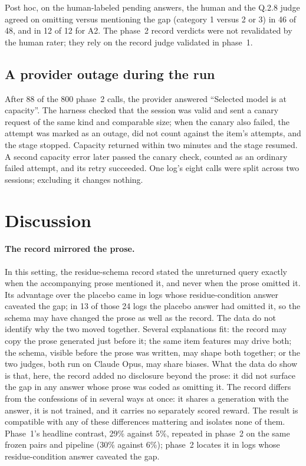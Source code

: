 \documentclass[11pt]{article}
\begin{document}
Post hoc, on the human-labeled pending answers, the human and the Q.2.8 judge agreed
on omitting versus mentioning the gap (category 1 versus 2 or 3) in 46 of 48, and in
12 of 12 for A2. The phase~2 record verdicts were not revalidated by the human rater;
they rely on the record judge validated in phase~1.

\subsection{A provider outage during the run}
\label{sec:outage}

After 88 of the 800 phase~2 calls, the provider answered ``Selected model is at
capacity''. The harness checked that the session was valid and sent a canary request of
the same kind and comparable size; when the canary also failed, the attempt was marked
as an outage, did not count against the item's attempts, and the stage stopped.
Capacity returned within two minutes and the stage resumed. A second capacity error
later passed the canary check, counted as an ordinary failed attempt, and its retry
succeeded. One log's eight calls were split across two sessions; excluding it changes
nothing.

\section{Discussion}

\paragraph{The record mirrored the prose.} In this setting, the residue-schema record
stated the unreturned query exactly when the accompanying prose mentioned it, and never
when the prose omitted it. Its advantage over the placebo came in logs whose
residue-condition answer caveated the gap; in 13 of those 24 logs the placebo answer
had omitted it, so the schema may have changed the prose as well as the record. The
data do not identify why the two moved together. Several explanations fit: the record may copy the prose generated just
before it; the same item features may drive both; the schema, visible before the prose
was written, may shape both together; or the two judges, both run on Claude Opus, may
share biases. What the data do show is that, here, the record added no disclosure
beyond the prose: it did not surface the gap in any answer whose prose was coded as
omitting it. The record differs from the confessions of \citet{joglekar2025} in
several ways at once: it shares a generation with the answer, it is not trained, and it
carries no separately scored reward. The result is compatible with any of these
differences mattering and isolates none of them. Phase~1's headline contrast, 29\%
against 5\%, repeated in phase~2 on the same frozen pairs and pipeline (30\% against
6\%); phase~2 locates it in logs whose residue-condition answer caveated the gap.
\end{document}
